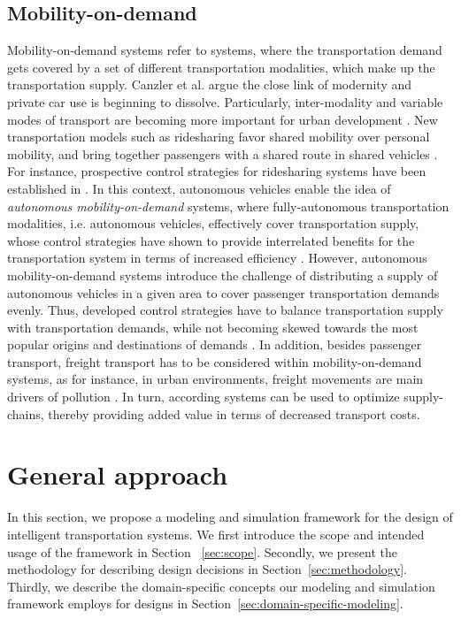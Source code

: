 \documentclass[a4paper,twoside]{article}
\begin{document}
	\subsection{Mobility-on-demand}
\label{sec:mobility-on-demand-systems}
	Mobility-on-demand systems refer to systems, where the transportation demand gets covered by a set of different transportation modalities, which make up the transportation supply.
	Canzler et al. \cite{canzler2016mobility} argue the close link of modernity and private car use is beginning to dissolve. Particularly, inter-modality and variable modes of transport are becoming more important for urban development \cite{rode2015towards}. New transportation models such as ridesharing favor shared mobility over personal mobility, and bring together passengers with a shared route in shared vehicles \cite{cohen2014ride}. For instance, prospective control strategies for ridesharing systems have been established in \cite{furuhata2013ridesharing,agatz2012optimization}.
	 In this context, autonomous vehicles enable the idea of \textit{autonomous mobility-on-demand} systems, where fully-autonomous transportation modalities, i.e. autonomous vehicles, effectively cover transportation supply, whose control strategies have shown to provide interrelated benefits for the transportation system in terms of increased efficiency \cite{fagnant2014travel}. However, autonomous mobility-on-demand systems introduce the challenge of distributing a supply of autonomous vehicles in a given area to cover passenger transportation demands evenly. Thus, developed control strategies have to balance transportation supply with transportation demands, while not becoming skewed towards the most popular origins and destinations of demands \cite{pavone2012robotic,zhang2016control}. In addition, besides passenger transport, freight transport has to be considered within mobility-on-demand systems, as for instance, in urban environments, freight movements are main drivers of pollution  \cite{amaral2015city}. In turn, according systems can be used to optimize supply-chains, thereby providing added value in terms of decreased transport costs. 
	
	\section{General approach}
	\label{sec:approach}
	
	In this section, we propose a modeling and simulation framework for the design of intelligent transportation systems.
	We first introduce the scope and intended usage of the framework in Section ~\ref{sec:scope}.
	Secondly, we present the methodology for describing design decisions in Section~\ref{sec:methodology}.
	Thirdly, we describe the domain-specific concepts our modeling and simulation framework employs for designs in Section~\ref{sec:domain-specific-modeling}.
	
\end{document}
